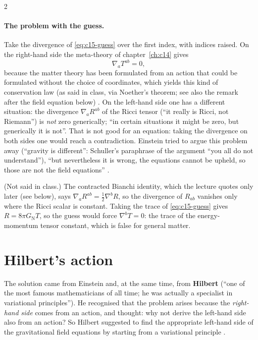 \begin{paracol}{2}
\paragraph{The problem with the guess.} Take the divergence of \eqref{eq:c15-guess} over the first index, with indices raised. On the right-hand side the meta-theory of chapter~\ref{ch:c14} gives
\[
  \nabla_aT^{ab}=0,
\]
because the matter theory has been formulated from an action that could be formulated without the choice of coordinates, which yields this kind of conservation law (as said in class, via Noether's theorem; see also the remark after the field equation below) . On the left-hand side one has a different situation: the divergence $\nabla_aR^{ab}$ of the Ricci tensor (``it really is Ricci, not Riemann'') is \emph{not} zero generically; ``in certain situations it might be zero, but generically it is not''. That is not good for an equation: taking the divergence on both sides one would reach a contradiction. Einstein tried to argue this problem away (``gravity is different'': Schuller's paraphrase of the argument ``you all do not understand''), ``but nevertheless it is wrong, the equations cannot be upheld, so those are not the field equations'' .
\begin{coursenote}
(Not said in class.) The contracted Bianchi identity, which the lecture quotes only later (see below), says $\nabla_aR^{ab}=\tfrac12\nabla^bR$, so the divergence of $R_{ab}$ vanishes only where the Ricci scalar is constant. Taking the trace of \eqref{eq:c15-guess} gives $R=8\pi G_{\mathrm N}T$, so the guess would force $\nabla^bT=0$: the trace of the energy-momentum tensor constant, which is false for general matter.
\end{coursenote}

\section{Hilbert's action}\label{sec:c15-hilbert}

The solution came from Einstein and, at the same time, from \textbf{Hilbert} (``one of the most famous mathematicians of all time; he was actually a specialist in variational principles''). He recognised that the problem arises because the \emph{right-hand side} comes from an action, and thought: why not derive the left-hand side also from an action? So Hilbert suggested to find the appropriate left-hand side of the gravitational field equations by starting from a variational principle .


\end{paracol}
